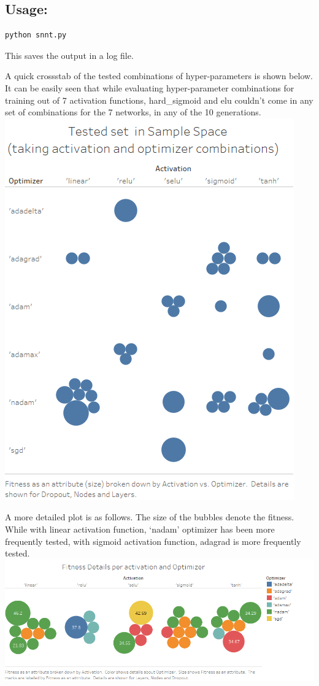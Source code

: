 \documentclass[]{article}
\begin{document}
\subsection{Usage:}\label{usage}

\begin{verbatim}
python snnt.py
\end{verbatim}

This saves the output in a log file.

A quick crossstab of the tested combinations of hyper-parameters is
shown below. It can be easily seen that while evaluating hyper-parameter
combinations for training out of 7 activation functions, hard\_sigmoid
and elu couldn't come in any set of combinations for the 7 networks, in
any of the 10 generations. \includegraphics{./Images/Samples.png}

A more detailed plot is as follows. The size of the bubbles denote the
fitness. While with linear activation function, `nadam' optimizer has
been more frequently tested, with sigmoid activation function, adagrad
is more frequently tested. \includegraphics{./Images/Details.png}
\end{document}
